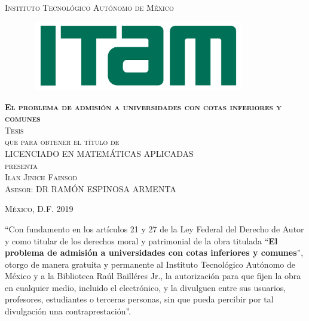 \documentclass[11pt]{book}
\begin{document}
\begin{titlepage}
\begin{center}

\textsc{\Large Instituto Tecnológico Autónomo de México}\\[4em]

\begin{figure}[h]
\begin{center}
\includegraphics[width=9.7cm, height=3cm]{logo-ITAM}
\end{center}
\end{figure}

\vspace{4em}

\textsc{\huge \textbf{El problema de admisión a universidades con cotas inferiores y comunes}}\\[4em]

\textsc{\large Tesis}\\[1em]

\textsc{que para obtener el título de}\\[1em]

\textsc{LICENCIADO EN MATEMÁTICAS APLICADAS}\\[1em]

\textsc{presenta}\\[1em]

\textsc{\Large Ilan Jinich Fainsod}\\[1em]

\textsc{\large Asesor: DR RAMÓN ESPINOSA ARMENTA }

\end{center}

\vspace*{\fill}
\textsc{México, D.F. \hspace*{\fill} 2019}

\end{titlepage}



\thispagestyle{empty}
\vspace*{\fill}
\begingroup
``Con fundamento en los artículos 21 y 27 de la Ley Federal del Derecho de Autor y como titular de los derechos moral y patrimonial de la obra titulada ``\textbf{El problema de admisión a universidades con cotas inferiores y comunes}'', otorgo de manera gratuita y permanente al Instituto Tecnológico Autónomo de México y a la Biblioteca Raúl Bailléres Jr., la autorización para que fijen la obra en cualquier medio, incluido el electrónico, y la divulguen entre sus usuarios, profesores, estudiantes o terceras personas, sin que pueda percibir por tal divulgación una contraprestación''.
\end{document}

